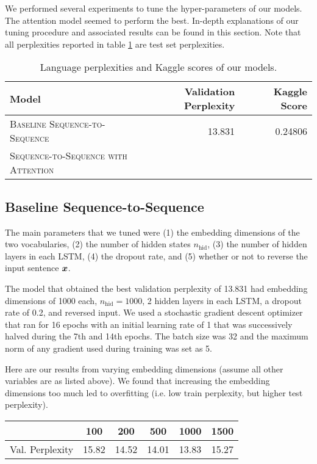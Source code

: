 \documentclass[11pt]{article}
\begin{document}
We performed several experiments to tune the hyper-parameters of our models. The attention model seemed to perform the best. In-depth explanations of our tuning procedure and associated results can be found in this section. Note that all perplexities reported in table \ref{tab:results} are test set perplexities.

\begin{table}[H]
\centering
\begin{tabular}{llr rr}
 \toprule
 Model &  & Validation Perplexity & & Kaggle Score\\
 \midrule
 \textsc{Baseline Sequence-to-Sequence} & & 13.831 & &0.24806\\
 \textsc{Sequence-to-Sequence with Attention} & &  \\
 \bottomrule 
\end{tabular}
\caption{\label{tab:results} Language perplexities and Kaggle scores of our models.}
\end{table}


\subsection{Baseline Sequence-to-Sequence} 
The main parameters that we tuned were (1) the embedding dimensions of the two vocabularies, (2) the number of hidden states $n_\text{hid}$, (3) the number of hidden layers in each LSTM, (4) the dropout rate, and (5) whether or not to reverse the input sentence $\boldsymbol{x}$.    

The model that obtained the best validation perplexity of 13.831 had embedding dimensions of 1000 each, $n_\text{hid} = 1000$, 2 hidden layers in each LSTM, a dropout rate of 0.2, and reversed input.  We used a stochastic gradient descent optimizer that ran for 16 epochs with an initial learning rate of 1 that was successively halved during the 7th and 14th epochs.  The batch size was 32 and the maximum norm of any gradient used during training was set as 5.

Here are our results from varying embedding dimensions (assume all other variables are as listed above).  We found that increasing the embedding dimensions too much led to overfitting (i.e. low train perplexity, but higher test perplexity).  

\begin{center}
	\begin{tabular}{ c | c c c c c}
		 \text{Embedding Dimension} & 100 & 200 & 500 & 1000 & 1500  \\
		\hline
		Val. Perplexity & 15.82 & 14.52 & 14.01 & 13.83 & 15.27
	\end{tabular}
\end{center}    
\end{document}
